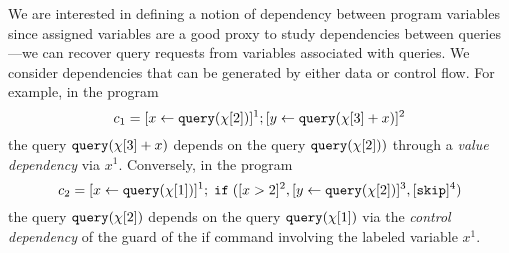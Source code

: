 %
We are interested in defining a notion of dependency between program variables since assigned variables are a good proxy to study dependencies between queries---we can recover query requests from variables associated with queries. We consider dependencies that can be generated by either data or control flow.
For example, in the program 
\[c_1 =[\mathrel{ x \leftarrow {\tt query}(\chi[2]) }]^1 ;[\mathrel{ y \leftarrow {\tt query}(\chi[3] + x) }]^2\]
the query ${\tt query}(\chi[3] + x)$  depends on the query ${\tt query}(\chi[2]))$ through a \emph{value dependency} via  $x^1$.
Conversely, in the program
\[c_2 = [\mathrel{ x \leftarrow {\tt query}(\chi[1]) }]^1 ; \;\mathtt{if}\;( [x > 2]^2 , [\mathrel{ y \leftarrow {\tt query}(\chi[2]) }]^3, [\mathtt{skip}]^4 )\] 
the query ${\tt query}(\chi[2])$  depends on the query ${\tt query}(\chi[1])$ via the \emph{control dependency} of the guard of the if command involving the labeled variable $x^1$.

